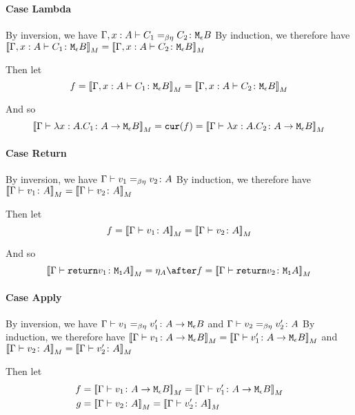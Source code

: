 \documentclass{report}
\begin{document}
    \paragraph{Case Lambda}
        By inversion, we have $\Gamma, x: A \vdash C_1 =_{\beta\eta} C_2 \colon \texttt{M}_{\epsilon}{B}$
        By induction, we therefore have ${\bf [\![}\Gamma, x: A \vdash C_1 \colon \texttt{M}_{\epsilon}{B}{\bf ]\!]}_M = {\bf [\![}\Gamma, x: A \vdash C_2 \colon \texttt{M}_{\epsilon}{B}{\bf ]\!]}_M$

        Then let
        \begin{equation}
            f = {\bf [\![}\Gamma, x: A \vdash C_1 \colon \texttt{M}_{\epsilon}{B}{\bf ]\!]}_M = {\bf [\![}\Gamma, x: A \vdash C_2 \colon \texttt{M}_{\epsilon}{B}{\bf ]\!]}_M
        \end{equation}

        And so
        \begin{equation}
            {\bf [\![}\Gamma \vdash \lambda x : A. C_1 \colon A \rightarrow \texttt{M}_{\epsilon}{B}{\bf ]\!]}_M = \texttt{cur}(f) = {\bf [\![}\Gamma \vdash \lambda x : A. C_2 \colon A \rightarrow \texttt{M}_{\epsilon}{B}{\bf ]\!]}_M
        \end{equation}


    \paragraph{Case Return}
    By inversion, we have $\Gamma \vdash v_1 =_{\beta\eta} v_2 \colon A$
    By induction, we therefore have ${\bf [\![}\Gamma \vdash v_1 \colon A{\bf ]\!]}_M = {\bf [\![}\Gamma \vdash v_2 \colon A{\bf ]\!]}_M$

    Then let
    \begin{equation}
        f = {\bf [\![}\Gamma \vdash v_1 \colon A{\bf ]\!]}_M = {\bf [\![}\Gamma \vdash v_2 \colon A{\bf ]\!]}_M
    \end{equation}

    And so
    \begin{equation}
        \deno{\gtyperelation{\return{v_1}}{\M{\1}{A}}} = \point{A}\after f = \deno{\gtyperelation{\return{v_2}}{\M{\1}{A}}}
    \end{equation}


    \paragraph{Case Apply}
    By inversion, we have $\Gamma \vdash v_1 =_{\beta\eta} v_1' \colon A \rightarrow \texttt{M}_{\epsilon}{B}$ and $\Gamma \vdash v_2 =_{\beta\eta} v_2' \colon A$
    By induction, we therefore have ${\bf [\![}\Gamma \vdash v_1 \colon A \rightarrow \texttt{M}_{\epsilon}{B}{\bf ]\!]}_M= {\bf [\![}\Gamma \vdash v_1' \colon A \rightarrow \texttt{M}_{\epsilon}{B}{\bf ]\!]}_M$ and ${\bf [\![}\Gamma \vdash v_2 \colon A{\bf ]\!]}_M = {\bf [\![}\Gamma \vdash v_2' \colon A{\bf ]\!]}_M$

    Then let
    \begin{align}
        f &{}= \deno{\gtyperelation{v_1}{\lamtype{A}{\e}{B}}} = \deno{\gtyperelation{v_1'}{\lamtype{A}{\e}{B}}}\\
        g &{}= \deno{\gtyperelation{v_2}{A}} = \deno{\gtyperelation{v_2'}{A}}
    \end{align}
\end{document}
